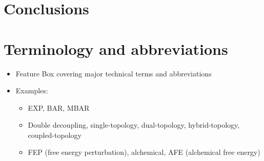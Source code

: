 \documentclass[9pt,bestpractices]{livecoms}
\begin{document}
\section{Conclusions}
\section{Terminology and abbreviations}
\label{sec:tem-abbrev}
\begin{itemize}
\item Feature Box covering major technical terms and abbreviations
\item Examples:
\begin{itemize}
\item EXP, BAR, MBAR
\item Double decoupling, single-topology, dual-topology, hybrid-topology, coupled-topology
\item FEP (free energy perturbation), alchemical, AFE (alchemical free energy)
\end{itemize}
\end{itemize}
\end{document}
